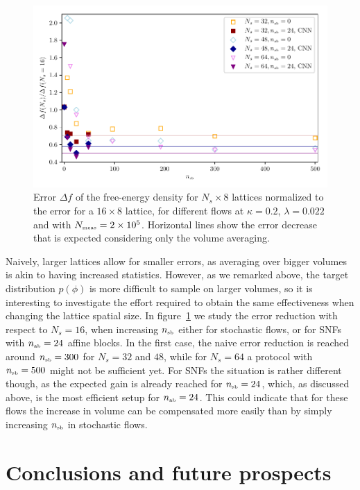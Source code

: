 \documentclass[11pt]{article}
\newcommand{\nab}{n_{\mbox{\tiny{ab}}}}
\newcommand{\nsb}{n_{\mbox{\tiny{sb}}}}
\newcommand{\nmeas}{N_{\mbox{\tiny{meas}}}}
\begin{document}
\begin{figure}[!htb]
\begin{center}
\includegraphics*[width=\textwidth]{error_comp_vol.pdf}
\caption{Error $\Delta f$ of the free-energy density for $N_s \times 8$ lattices normalized to the error for a $16 \times 8$ lattice, for different flows at $\kappa=0.2$, $\lambda=0.022$ and with $\nmeas = 2 \times 10^5$. Horizontal lines show the error decrease that is expected considering only the volume averaging.\label{fig:error_ratio_vol}}
\end{center}
\end{figure}

Naively, larger lattices allow for smaller errors, as averaging over bigger volumes is akin to having increased statistics. However, as we remarked above, the target distribution $p(\phi)$ is more difficult to sample on larger volumes, so it is interesting to investigate the effort required to obtain the same effectiveness when changing the lattice spatial size. In figure~\ref{fig:error_ratio_vol} we study the error reduction with respect to $N_s=16$, when increasing $\nsb$ either for stochastic flows, or for SNFs with $\nab=24$ affine blocks. In the first case, the naive error reduction is reached around $\nsb=300$ for $N_s = 32$ and $48$, while for $N_s=64$ a protocol with $\nsb=500$ might not be sufficient yet. For SNFs the situation is rather different though, as the expected gain is already reached for $\nsb=24$, which, as discussed above, is the most efficient setup for $\nab=24$. This could indicate that for these flows the increase in volume can be compensated more easily than by simply increasing $\nsb$ in stochastic flows.

\section{Conclusions and future prospects}
\label{sec:conclusions_and_future_prospects}
\end{document}
